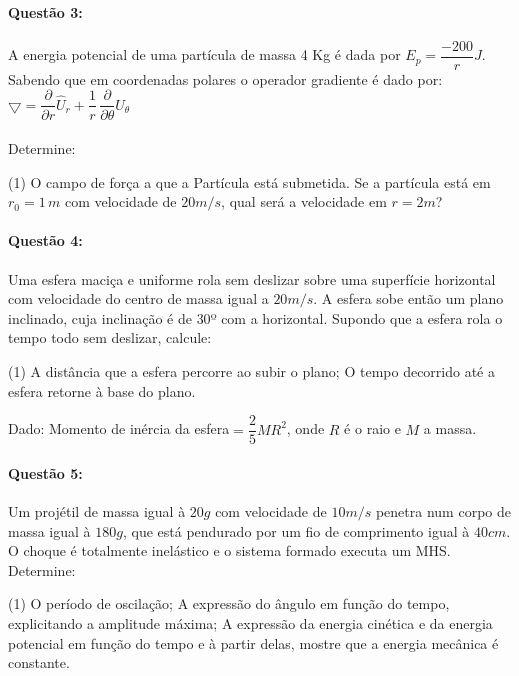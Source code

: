 \documentclass[12pt,a4paper]{article}
\begin{document}
\paragraph{Questão 3:}
A energia potencial de uma partícula de massa 4 Kg é dada por $E_p=\dfrac{-200}{r}J$. Sabendo que em coordenadas polares o operador gradiente é dado por:   $\bigtriangledown =\dfrac{\partial }{\partial r}\widehat{U}_r+\dfrac{1}{r}\, \dfrac{\partial }{\partial \theta}\widehat{U}_\theta$\\
\\
Determine:\\

\begin{tasks}(1)
\task O campo de força a que a Partícula está submetida.
\task Se a partícula está em $r_0=1\,m$ com velocidade de $20m/s$, qual será a velocidade em $r=2m$?
\end{tasks}

\paragraph{Questão 4:}
Uma esfera maciça e uniforme rola sem deslizar sobre uma superfície horizontal com velocidade do centro de massa igual a $20m/s$. A esfera sobe então um plano inclinado, cuja inclinação é de $30$º com a horizontal. Supondo que a esfera rola o tempo todo sem deslizar, calcule:

\begin{tasks}(1)
\task A distância que a esfera percorre ao subir o plano;
\task O tempo decorrido até a esfera retorne à base do plano.
\end{tasks}

Dado: Momento de inércia da esfera$=\dfrac{2}{5}MR^2$, onde $R$ é o raio e $M$ a massa.

\paragraph{Questão 5:}
Um projétil de massa igual à $20g$ com velocidade de $10m/s$ penetra num corpo de massa igual à $180g$, que está pendurado por um fio de comprimento igual à $40cm$. O choque é totalmente inelástico e o sistema formado executa um MHS. Determine:

\begin{tasks}(1)
\task O período de oscilação;
\task A expressão do ângulo em função do tempo, explicitando a amplitude máxima;
\task A expressão da energia cinética e da energia potencial em função do tempo e à partir delas, mostre que a energia mecânica é constante.
\end{tasks}
\end{document}
